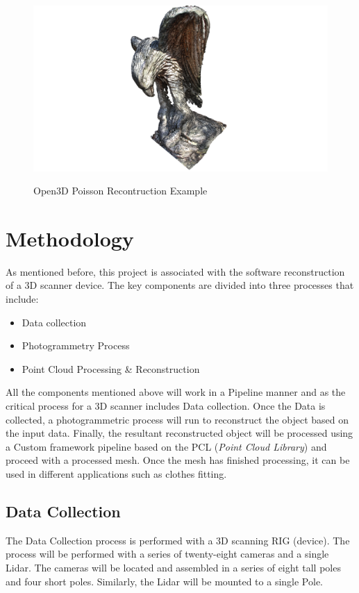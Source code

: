 \documentclass[12pt]{report}
\begin{document}
\begin{figure}[H]%
  \centering
  \includegraphics[width=1\textwidth]{open3dpoisson.png}
 \caption{Open3D Poisson Recontruction Example}\cite[]{Zhou2018}
 \label{fig:Possion_exampple} 
\end{figure}




\chapter{Methodology}
As mentioned before, this project is associated with the software reconstruction of a 3D scanner device.
The key components are divided into three processes that include:

\begin{itemize}
  \item Data collection
  \item Photogrammetry Process
  \item Point Cloud Processing \& Reconstruction
\end{itemize}

All the components mentioned above will work in a Pipeline manner and as the critical process for a 3D scanner includes  Data collection. 
Once the Data is collected, a photogrammetric process will run to reconstruct the object based on the input data. 
Finally, the resultant reconstructed object will be processed using a Custom framework pipeline based on the PCL (\textit{Point Cloud Library}) and proceed with a processed mesh.
Once the mesh has finished processing, it can be used in different applications such as clothes fitting.

\section{Data Collection}
The Data Collection process is performed with a 3D scanning RIG (device).
The process will be performed with a series of twenty-eight cameras and a single Lidar. 
The cameras will be located and assembled in a series of eight tall poles and four short poles. Similarly, the Lidar will be mounted to a single Pole.
\end{document}
